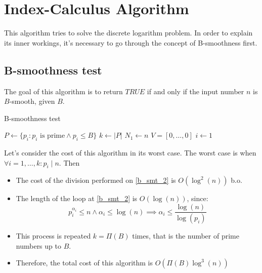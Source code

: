 \section{Index-Calculus Algorithm}
This algorithm tries to solve the discrete logarithm problem. In order to explain its inner workings, it's necessary to go through the concept of B-smoothness first.
\subsection{B-smoothness test}
The goal of this algorithm is to return $TRUE$ if and only if the input number $n$ is $B$-smooth, given $B$.

\begin{algorithm}
\caption{B-smoothness test}\label{alg:b_smoothness_test}
    $P \gets \{p_{i} : p_{i} \text{ is prime} \land p_{i} \leq B\}$\;
    $k \gets |P|$\;
    $N_{1} \gets n$\;
    $V = [0, \dots, 0]$\;
    $i \gets 1$\;
\end{algorithm}
Let's consider the cost of this algorithm in its worst case.\newline
The worst case is when $\forall i = 1, \dots, k: p_{i} \mid n$. Then
\begin{itemize}
    \item The cost of the division performed on \ref{b_smt_2} is $O(\operatorname{log}^{2}(n))$ b.o.
    \item The length of the loop at \ref{b_smt_2} is $O(\operatorname{log}(n))$, since:
    \[p_{i}^{\alpha_{i}} \leq n \land \alpha_{i} \leq \operatorname{log}(n) \implies \alpha_{i} \leq \frac{\operatorname{log}(n)}{\operatorname{log}(p_{i})}\]
    \item This process is repeated $k = \Pi(B)$ times, that is the number of prime numbers up to $B$.
    \item Therefore, the total cost of this algorithm is $O(\Pi(B) \operatorname{log}^{3}(n))$
\end{itemize}

